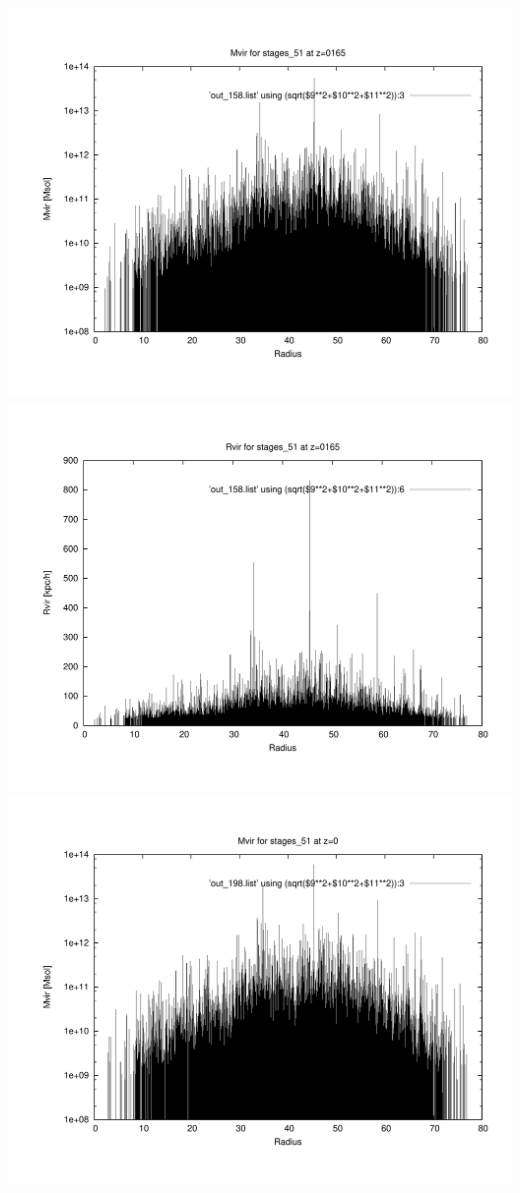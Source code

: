 \includegraphics[scale=0.3]{stages_51/plot_mvir_z0165.pdf}
\includegraphics[scale=0.3]{stages_51/plot_rvir_z0165.pdf}
\includegraphics[scale=0.3]{stages_51/plot_mvir_z0.pdf}
